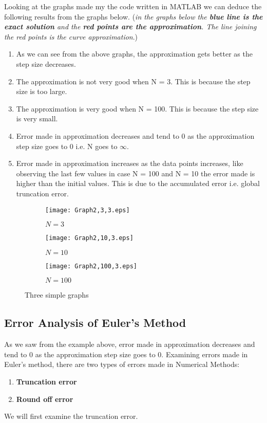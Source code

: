 \documentclass[11pt,a4paper]{amsart}
\begin{document}
\vspace{5px}
Looking at the graphs made my the code written in MATLAB we can deduce the following results from the graphs below. ({\em in the graphs below the {\bf \em blue line is the exact solution} and the {\bf \em red points are the approximation}. The line joining the red points is the curve approximation}.)
\begin{enumerate}
	\item As we can see from the above graphs, the approximation gets better as the step size decreases.
	\item The approximation is not very good when N = 3. This is because the step size is too large.
	\item The approximation is very good when N = 100. This is because the step size is very small.
	\item Error made in approximation decreases and tend to 0 as the approximation step size goes to 0 i.e. N goes to $\infty$.
	\item Error made in approximation increases as the data points increases, like observing the last few values in case N = 100 and N = 10 the error made is higher than the initial values. This is due to the accumulated error i.e. global truncation error.
\clearpage
\end{enumerate}
\begin{figure}[h]
	\centering
	\begin{subfigure}[b,h]{0.45\textwidth}
		\centering
		\texttt{[image: Graph2,3,3.eps]}
		\caption{$N=3$}
		\label{fig:y equals x}
	\end{subfigure}
	\hfill
	\begin{subfigure}[b,h]{0.45\textwidth}
		\centering
		\texttt{[image: Graph2,10,3.eps]}
		\caption{$N=10$}
		\label{fig:three sin x}
	\end{subfigure}
	\hfill
	\begin{subfigure}[b,h]{0.45\textwidth}
		\centering
		\texttt{[image: Graph2,100,3.eps]}
		\caption{$N=100$}
		\label{fig:five over x}
	\end{subfigure}
	   \caption{Three simple graphs}
	   \label{fig:three graphs}
\end{figure}

\subsection{Error Analysis of Euler's Method} As we saw from the example above, error made in approximation decreases and tend to 0 as the approximation step size goes to 0.
Examining errors made in Euler's method, there are two types of errors made in Numerical Methods:
\begin{enumerate}
	\item {\bf Truncation error}
	\item {\bf Round off error}
\end{enumerate}
We will first examine the truncation error.
\vspace{-5px}
\end{document}
